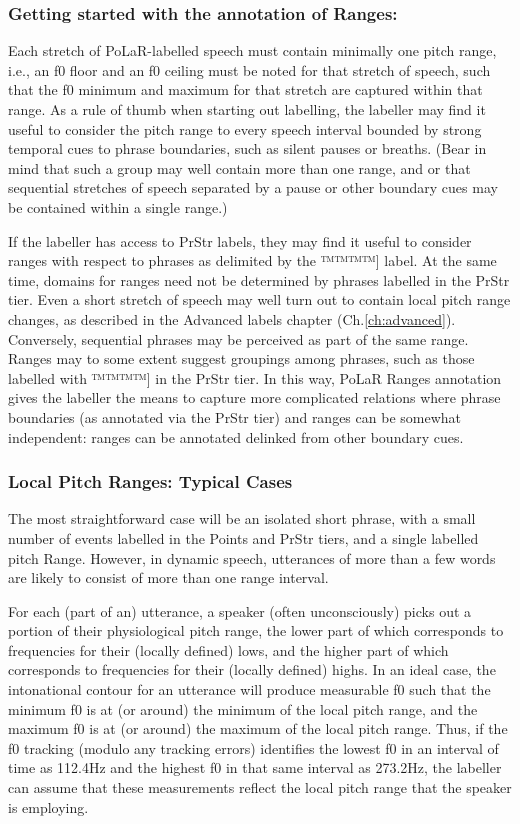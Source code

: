 \documentclass[11pt, twoside]{memoir}
\begin{document}
\subsubsection{Getting started with the annotation of Ranges:}\label{sec:getting-started-with-the-annotation-of-ranges}

Each stretch of PoLaR-labelled speech must contain minimally one pitch range, i.e., an f0 floor and an f0 ceiling must be noted for that stretch of speech, such that the f0 minimum and maximum for that stretch are captured within that range. As a rule of thumb when starting out labelling, the labeller may find it useful to consider the pitch range to every speech interval bounded by strong temporal cues to phrase boundaries, such as silent pauses or breaths. (Bear in mind that such a group may well contain more than one range, and or that sequential stretches of speech separated by a pause or other boundary cues may be contained within a single range.)

If the labeller has access to PrStr labels, they may find it useful to consider ranges with respect to phrases as delimited by the ™™™™{]} label. At the same time, domains for ranges need not be determined by phrases labelled in the PrStr tier. Even a short stretch of speech may well turn out to contain local pitch range changes, as described in the Advanced labels chapter (Ch.\ref{ch:advanced}). Conversely, sequential phrases may be perceived as part of the same range. Ranges may to some extent suggest groupings among phrases, such as those labelled with ™™™™{]} in the PrStr tier. In this way, PoLaR Ranges annotation gives the labeller the means to capture more complicated relations where phrase boundaries (as annotated via the PrStr tier) and ranges can be somewhat independent: ranges can be annotated delinked from other boundary cues.

\subsubsection{Local Pitch Ranges: Typical Cases}\label{sec:local-pitch-ranges-typical-cases}

The most straightforward case will be an isolated short phrase, with a small number of events labelled in the Points and PrStr tiers, and a single labelled pitch Range. However, in dynamic speech, utterances of more than a few words are likely to consist of more than one range interval.

For each (part of an) utterance, a speaker (often unconsciously) picks out a portion of their physiological pitch range, the lower part of which corresponds to frequencies for their (locally defined) lows, and the higher part of which corresponds to frequencies for their (locally defined) highs. In an ideal case, the intonational contour for an utterance will produce measurable f0 such that the minimum f0 is at (or around) the minimum of the local pitch range, and the maximum f0 is at (or around) the maximum of the local pitch range. Thus, if the f0 tracking (modulo any tracking errors) identifies the lowest f0 in an interval of time as 112.4Hz and the highest f0 in that same interval as 273.2Hz, the labeller can assume that these measurements reflect the local pitch range that the speaker is employing.
\end{document}

